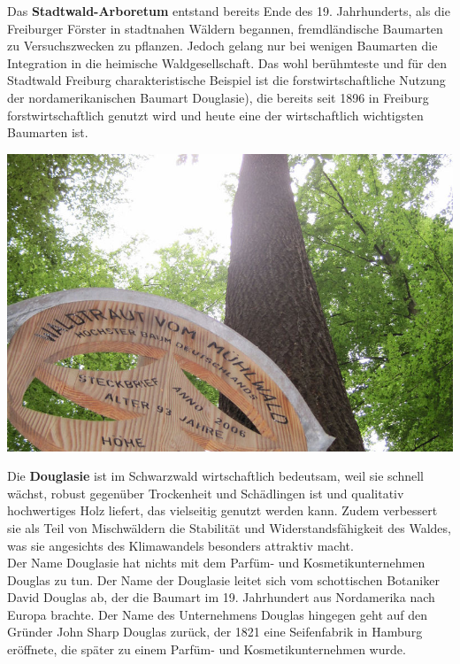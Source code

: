 \documentclass[landscape, a4paper]{article}
\newcommand\alert[1]{\textcolor{PrimaryColor}{\textbf{#1}}}
\begin{document}
\begin{minipage}[t]{0.33\textwidth}
	\setlength{\parskip}{0.25cm}
	Das \alert{Stadtwald-Arboretum} entstand bereits Ende des 19. Jahrhunderts, als die Freiburger Förster in stadtnahen Wäldern begannen, fremdländische Baumarten zu Versuchszwecken zu pflanzen. Jedoch gelang nur bei wenigen Baumarten die Integration in die heimische Waldgesellschaft. Das wohl berühmteste und für den Stadtwald Freiburg charakteristische Beispiel ist die forstwirtschaftliche Nutzung der nordamerikanischen Baumart Douglasie), die bereits seit 1896 in Freiburg forstwirtschaftlich genutzt wird und heute eine der wirtschaftlich wichtigsten Baumarten ist.

	\includegraphics[width=\linewidth]{./figures/waldraud.png}
	\setlength{\parskip}{0.25cm}
	\vspace{0.15cm}

	Die \alert{Douglasie} ist im Schwarzwald wirtschaftlich bedeutsam, weil sie schnell wächst, robust gegenüber Trockenheit und Schädlingen ist und qualitativ hochwertiges Holz liefert, das vielseitig genutzt werden kann. Zudem verbessert sie als Teil von Mischwäldern die Stabilität und Widerstandsfähigkeit des Waldes, was sie angesichts des Klimawandels besonders attraktiv macht.\\
	Der Name Douglasie hat nichts mit dem Parfüm- und Kosmetikunternehmen Douglas zu tun. Der Name der Douglasie leitet sich vom schottischen Botaniker David Douglas ab, der die Baumart im 19. Jahrhundert aus Nordamerika nach Europa brachte. Der Name des Unternehmens Douglas hingegen geht auf den Gründer John Sharp Douglas zurück, der 1821 eine Seifenfabrik in Hamburg eröffnete, die später zu einem Parfüm- und Kosmetikunternehmen wurde.


\end{minipage}
\end{document}

